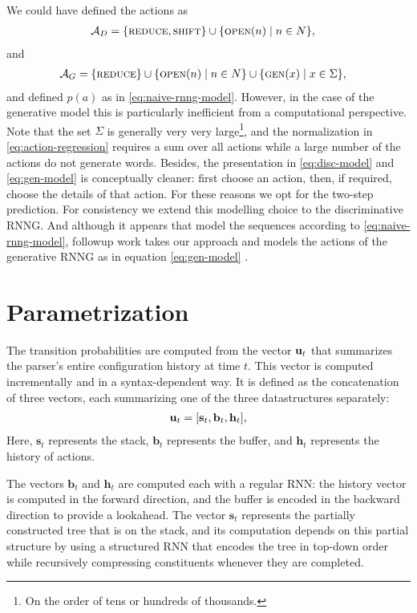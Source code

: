 \begin{remark} We could have defined the actions as
  \begin{align*}
    \mathcal{A}_D &= \{ \textsc{reduce}, \textsc{shift} \} \cup \{ \textsc{open}(n) \mid n \in N \},
  \end{align*}
  and
  \begin{align*}
    \mathcal{A}_G &= \{ \textsc{reduce} \} \cup \{ \textsc{open}(n) \mid n \in N \} \cup \{ \textsc{gen}(x) \mid x \in \Sigma \},
  \end{align*}
  and defined $p(a)$ as in \ref{eq:naive-rnng-model}. However, in the case of the generative model this is particularly inefficient from a computational perspective. Note that the set $\Sigma$ is generally very very large\footnote{On the order of tens or hundreds of thousands.}, and the normalization in \ref{eq:action-regression} requires a sum over all actions while a large number of the actions do not generate words. Besides, the presentation in \ref{eq:disc-model} and \ref{eq:gen-model} is conceptually cleaner: first choose an action, then, if required, choose the details of that action. For these reasons we opt for the two-step prediction. For consistency we extend this modelling choice to the discriminative RNNG. And although it appears that \citet{dyer2016rnng} model the sequences according to \ref{eq:naive-rnng-model}, followup work takes our approach and models the actions of the generative RNNG as in equation \ref{eq:gen-model} \citep{hale2018beam}.
\end{remark}


\section{Parametrization}
The transition probabilities are computed from the vector $\mathbf{u}_t$ that summarizes the parser's entire configuration history at time $t$. This vector is computed incrementally and in a syntax-dependent way. It is defined as the concatenation of three vectors, each summarizing one of the three datastructures separately:
\begin{align*}
  \mathbf{u}_t = [\mathbf{s}_t, \mathbf{b}_t, \mathbf{h}_t],
\end{align*}
Here, $\mathbf{s}_t$ represents the stack, $\mathbf{b}_t$ represents the buffer, and $\mathbf{h}_t$ represents the history of actions.

The vectors $\mathbf{b}_t$ and $\mathbf{h}_t$ are computed each with a regular RNN: the history vector is computed in the forward direction, and the buffer is encoded in the backward direction to provide a lookahead. The vector $\mathbf{s}_t$ represents the partially constructed tree that is on the stack, and its computation depends on this partial structure by using a structured RNN that encodes the tree in top-down order while recursively compressing constituents whenever they are completed.

